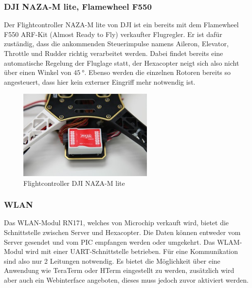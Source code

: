     \subsubsection{DJI NAZA-M lite, Flamewheel F550}
    Der Flightcontroller NAZA-M lite von DJI ist ein bereits mit dem Flamewheel F550 ARF-Kit (Almost Ready to Fly) verkaufter Flugregler.
    Er ist dafür zuständig, dass die ankommenden Steuerimpulse namens Aileron, Elevator, Throttle und Rudder richtig verarbeitet werden.
    Dabei findet bereits eine automatische Regelung der Fluglage statt, der Hexacopter neigt sich also nicht \zB über einen Winkel von $\SI{45}{\degree}$.
    Ebenso werden die einzelnen Rotoren bereits so angesteuert, dass hier kein externer Eingriff mehr notwendig ist.
    \begin{figure}[H]
      \begin{centering}
        \includegraphics[width = 0.6\textwidth]{Bilder/NAZA_M-lite}
      \par\end{centering}
      \caption[Flightcontroller DJI NAZA-M lite]{Flightcontroller DJI NAZA-M lite\cite{NAZA_M-lite}}
      \label{NAZA_M-lite}
    \end{figure}

    \subsubsection{WLAN}
    Das WLAN-Modul RN171, welches von Microchip verkauft wird, bietet die Schnittstelle zwischen Server und Hexacopter. Die Daten können entweder vom Server gesendet
    und vom PIC empfangen werden oder umgekehrt.
    Das WLAM-Modul wird mit einer UART-Schnittstelle betrieben. Für eine Kommunikation sind also nur 2 Leitungen notwendig.
    Es bietet die Möglichkeit über eine Anwendung wie TeraTerm oder HTerm eingestellt zu werden, zusätzlich wird aber auch ein Webinterface angeboten, dieses muss jedoch zuvor
    aktiviert werden.

